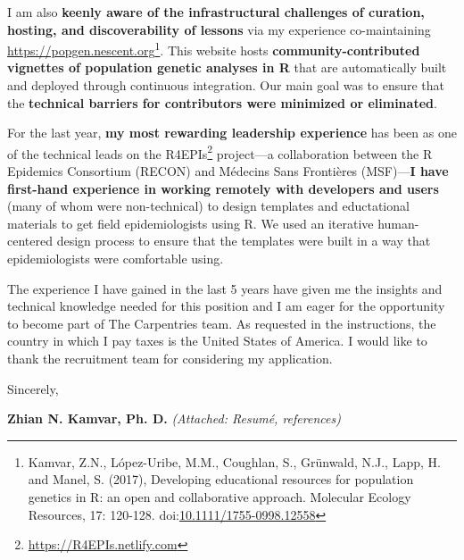 \vspace{1ex}

I am also \textbf{keenly aware of the infrastructural challenges of curation,
hosting, and discoverability of lessons} via my experience co-maintaining
\url{https://popgen.nescent.org}\footnote{Kamvar, Z.N., López-Uribe, M.M.,
Coughlan, S., Grünwald, N.J., Lapp, H. and Manel, S. (2017), Developing
educational resources for population genetics in R: an open and collaborative
approach. Molecular Ecology Resources, 17: 120-128.
doi:\href{https://doi.org/10.1111/1755-0998.12558}{10.1111/1755-0998.12558}}.
This website hosts \textbf{community-contributed vignettes of population
genetic analyses in R} that are automatically built and deployed through
continuous integration. Our main goal was to ensure that the \textbf{technical
barriers for contributors were minimized or eliminated}.

\vspace{1ex}

For the last year, \textbf{my most rewarding leadership experience} has been as
one of the technical leads on the
R4EPIs\footnote{\url{https://R4EPIs.netlify.com}} project---a collaboration
between the R Epidemics Consortium (RECON) and M\'{e}decins Sans Fronti\`{e}res
(MSF)---\textbf{I have first-hand experience in working remotely with
developers and users} (many of whom were non-technical) to design templates and
eductational materials to get field epidemiologists using R. We used an
iterative human-centered design process to ensure that the templates were built
in a way that epidemiologists were comfortable using. 

\vspace{1ex}

The experience I have gained in the last 5 years have given me the insights and
technical knowledge needed for this position and I am eager for the opportunity
to become part of The Carpentries team. As requested in the instructions, the
country in which I pay taxes is the United States of America. I would like to
thank the recruitment team for considering my application. 

\vspace{2ex}

Sincerely,

\vspace{3ex}

\textbf{Zhian N. Kamvar, Ph. D.}
{\footnotesize \textit{(Attached: Resum\'{e}, references)}}



\clearpage
